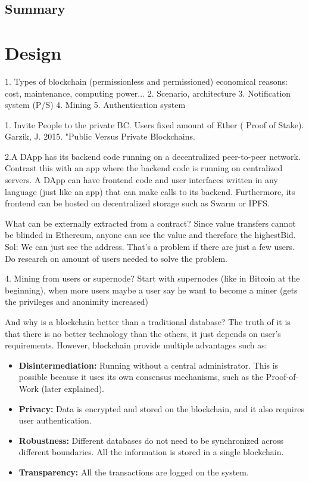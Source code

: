 \section{Summary}



\chapter{Design}
\label{ch:design}


1. Types of blockchain (permissionless and permissioned) economical reasons: cost, maintenance, computing power...
2. Scenario, architecture
3. Notification system (P/S)
4. Mining
5. Authentication system

1. Invite People to the private BC. Users fixed amount of Ether ( Proof of Stake). Garzik, J. 2015. "Public Versus Private Blockchains.

2.A DApp has its backend code running on a decentralized peer-to-peer network. Contrast this with an app where the backend code is running on centralized servers. A DApp can have frontend code and user interfaces written in any language (just like an app) that can make calls to its backend. Furthermore, its frontend can be hosted on decentralized storage such as Swarm or IPFS.

What can be externally extracted from a contract? Since value transfers cannot be blinded in Ethereum, anyone can see the value and therefore the highestBid. Sol: We can just see the address. That's a problem if there are just a few users. Do research on amount of users needed to solve the problem.

4. Mining from users or supernode? Start with supernodes (like in Bitcoin at the beginning), when more users maybe a user say he want to become a miner (gets the privileges and anonimity increased)

And why is a blockchain better than a traditional database? The truth of it is that there is no better technology than the others, it just depends on user's requirements. However, blockchain provide multiple advantages such as:
\begin{itemize}
	
	\item \textbf{Disintermediation:} Running without a central administrator. This is possible because it uses its own consensus mechanisms, such as the Proof-of-Work (later explained).  
	\item \textbf{Privacy:} Data is encrypted and stored on the blockchain, and it also requires user authentication.
	\item \textbf{Robustness:} Different databases do not need to be synchronized across different boundaries. All the information is stored in a single blockchain.
	\item \textbf{Transparency:} All the transactions are logged on the system.
\end{itemize}


